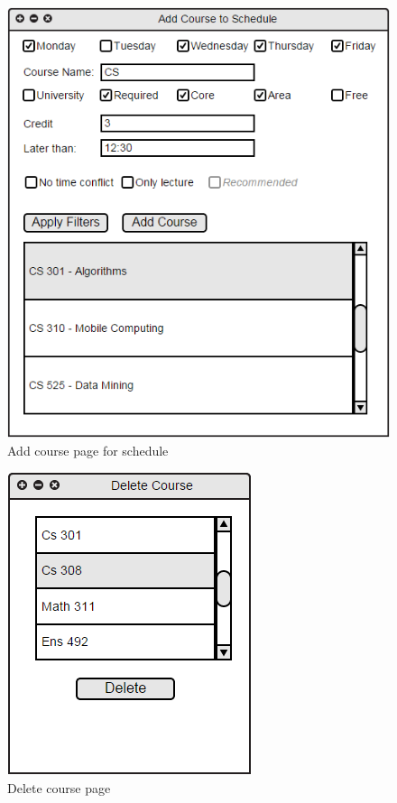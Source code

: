 \documentclass[twoside,letterpaper]{article}
\begin{document}
\begin{figure}[h!]
\centering
\includegraphics[keepaspectratio, scale=0.45]{Mockups/addCourseSchedule.png}
\caption{Add course page for schedule}
\label{fig:mockupScheduleAdd}
\end{figure}

\begin{figure}[h!]
\centering
\includegraphics[keepaspectratio, scale=0.45]{Mockups/deleteCourse.png}
\caption{Delete course page}
\label{fig:mockupDelete}
\end{figure}
\end{document}
